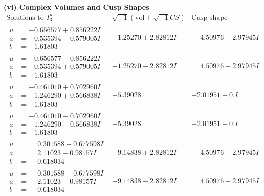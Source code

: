 \documentclass[1p]{elsarticle_modified}
\theoremstyle{definition}
\newcommand{\I}{\sqrt{-1}}
\begin{document}
\newpage\flushleft \textbf{(vi) Complex Volumes and Cusp Shapes}
$$\begin{array}{c|c|c}  
\text{Solutions to }I^u_{3}& \I (\text{vol} + \sqrt{-1}CS) & \text{Cusp shape}\\
 \hline 
\begin{aligned}
u &= -0.656577 + 0.856222 I \\
a &= -0.535394 - 0.579005 I \\
b &= -1.61803\phantom{ +0.000000I}\end{aligned}
 & -1.25270 + 2.82812 I & \phantom{-}4.50976 - 2.97945 I \\ \hline\begin{aligned}
u &= -0.656577 - 0.856222 I \\
a &= -0.535394 + 0.579005 I \\
b &= -1.61803\phantom{ +0.000000I}\end{aligned}
 & -1.25270 - 2.82812 I & \phantom{-}4.50976 + 2.97945 I \\ \hline\begin{aligned}
u &= -0.461010 + 0.702960 I \\
a &= -1.246290 + 0.566838 I \\
b &= -1.61803\phantom{ +0.000000I}\end{aligned}
 & -5.39028\phantom{ +0.000000I} & -2.01951 + 0. I\phantom{ +0.000000I} \\ \hline\begin{aligned}
u &= -0.461010 - 0.702960 I \\
a &= -1.246290 - 0.566838 I \\
b &= -1.61803\phantom{ +0.000000I}\end{aligned}
 & -5.39028\phantom{ +0.000000I} & -2.01951 + 0. I\phantom{ +0.000000I} \\ \hline\begin{aligned}
u &= \phantom{-}0.301588 + 0.677598 I \\
a &= \phantom{-}2.11023 + 0.98157 I \\
b &= \phantom{-}0.618034\phantom{ +0.000000I}\end{aligned}
 & -9.14838 + 2.82812 I & \phantom{-}4.50976 - 2.97945 I \\ \hline\begin{aligned}
u &= \phantom{-}0.301588 - 0.677598 I \\
a &= \phantom{-}2.11023 - 0.98157 I \\
b &= \phantom{-}0.618034\phantom{ +0.000000I}\end{aligned}
 & -9.14838 - 2.82812 I & \phantom{-}4.50976 + 2.97945 I \\ \hline\begin{aligned}

\end{aligned}
\end{array}$$
\end{document}
